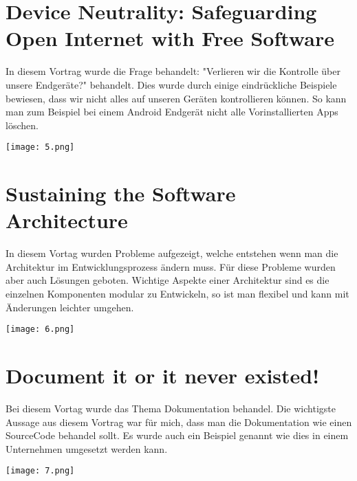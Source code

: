 \documentclass[10pt,ngerman]{scrartcl}
\begin{document}
\section*{Device Neutrality: Safeguarding Open Internet with Free Software}
\begin{minipage}[b]{0.65\linewidth}
In diesem Vortrag wurde die Frage behandelt: "Verlieren wir die Kontrolle über unsere Endgeräte?" behandelt. Dies wurde durch einige eindrückliche Beispiele bewiesen, dass wir nicht alles auf unseren Geräten kontrollieren können. So kann man zum Beispiel bei einem Android Endgerät nicht alle Vorinstallierten Apps löschen.
\end{minipage}
\hfill
\begin{minipage}[b]{0.35\linewidth}
\begin{flushright}
\texttt{[image: 5.png]}
\end{flushright}
\end{minipage}
\pagebreak
\section*{Sustaining the Software Architecture}
\begin{minipage}[b]{0.65\linewidth}
In diesem Vortag wurden Probleme aufgezeigt, welche entstehen wenn man die Architektur im Entwicklungsprozess ändern muss. Für diese Probleme wurden aber auch Lösungen geboten. Wichtige Aspekte einer Architektur sind es die einzelnen Komponenten modular zu Entwickeln, so ist man flexibel und kann mit Änderungen leichter umgehen.
\end{minipage}
\hfill
\begin{minipage}[b]{0.35\linewidth}
\begin{flushright}
\texttt{[image: 6.png]}
\end{flushright}
\end{minipage}

\section*{Document it or it never existed!}
\begin{minipage}[b]{0.65\linewidth}
Bei diesem Vortag wurde das Thema Dokumentation behandel. Die wichtigste Aussage aus diesem Vortrag war für mich, dass man die Dokumentation wie einen SourceCode behandel sollt. Es wurde auch ein Beispiel genannt wie dies in einem Unternehmen umgesetzt werden kann.
\end{minipage}
\hfill
\begin{minipage}[b]{0.35\linewidth}
\begin{flushright}
\texttt{[image: 7.png]}
\end{flushright}
\end{minipage}
\end{document}
